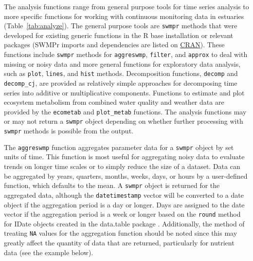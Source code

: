 The analysis functions range from general purpose tools for time series analysis to more specific functions for working with continuous monitoring data in estuaries (Table~\ref{tab:analyze}).  The general purpose tools are \texttt{swmpr} methods that were developed for existing generic functions in the R base installation or relevant packages (SWMPr imports and dependencies are listed on \href{http://cran.r-project.org/web/packages/SWMPr/index.html}{CRAN}). These functions include \texttt{swmpr} methods for \texttt{aggreswmp}, \texttt{filter}, and \texttt{approx} to deal with missing or noisy data and more general functions for exploratory data analysis, such as \texttt{plot}, \texttt{lines}, and \texttt{hist} methods.  Decomposition functions, \texttt{decomp} and \texttt{decomp\_cj}, are provided as relatively simple approaches for decomposing time series into additive or multiplicative components. Functions to estimate and plot ecosystem metabolism from combined water quality and weather data are provided by the \texttt{ecometab} and \texttt{plot\_metab} functions.  The analysis functions may or may not return a \texttt{swmpr} object depending on whether further processing with \texttt{swmpr} methods is possible from the output.    

The \texttt{aggreswmp} function aggregates parameter data for a \texttt{swmpr} object by set units of time.  This function is most useful for aggregating noisy data to evaluate trends on longer time scales or to simply reduce the size of a dataset.  Data can be aggregated by years, quarters, months, weeks, days, or hours by a user-defined function, which defaults to the mean.  A \texttt{swmpr} object is returned for the aggregated data, although the \texttt{datetimestamp} vector will be converted to a date object if the aggregation period is a day or longer.  Days are assigned to the date vector if the aggregation period is a week or longer based on the \texttt{round} method for IDate objects created in the data.table package \cite{Dowle14}.  Additionally, the method of treating \texttt{NA} values for the aggregation function should be noted since this may greatly affect the quantity of data that are returned, particularly for nutrient data (see the example below).

